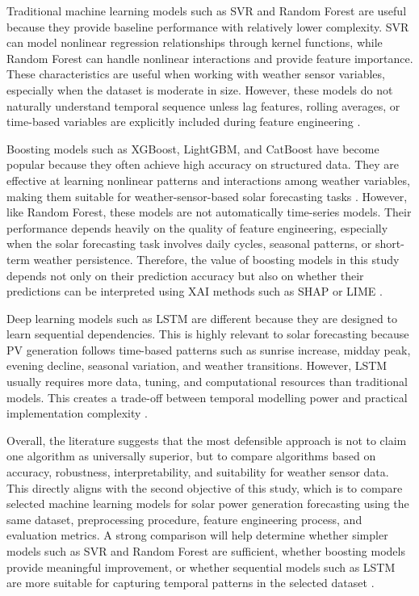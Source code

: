 Traditional machine learning models such as SVR and Random Forest are useful because they provide baseline performance with relatively lower complexity. SVR can model nonlinear regression relationships through kernel functions, while Random Forest can handle nonlinear interactions and provide feature importance. These characteristics are useful when working with weather sensor variables, especially when the dataset is moderate in size. However, these models do not naturally understand temporal sequence unless lag features, rolling averages, or time-based variables are explicitly included during feature engineering \parencite{JnanaVarshitha2025, Alhassan2025, CarvalhoJunior2025}.

Boosting models such as XGBoost, LightGBM, and CatBoost have become popular because they often achieve high accuracy on structured data. They are effective at learning nonlinear patterns and interactions among weather variables, making them suitable for weather-sensor-based solar forecasting tasks \parencite{JnanaVarshitha2025, Bakht2025, Alhassan2025}. However, like Random Forest, these models are not automatically time-series models. Their performance depends heavily on the quality of feature engineering, especially when the solar forecasting task involves daily cycles, seasonal patterns, or short-term weather persistence. Therefore, the value of boosting models in this study depends not only on their prediction accuracy but also on whether their predictions can be interpreted using XAI methods such as SHAP or LIME \parencite{TsaiLo2025, Pongphaw2025, JnanaVarshitha2025}.

Deep learning models such as LSTM are different because they are designed to learn sequential dependencies. This is highly relevant to solar forecasting because PV generation follows time-based patterns such as sunrise increase, midday peak, evening decline, seasonal variation, and weather transitions. However, LSTM usually requires more data, tuning, and computational resources than traditional models. This creates a trade-off between temporal modelling power and practical implementation complexity \parencite{Eren2025, TsaiLo2025, Duvuru2026}.

Overall, the literature suggests that the most defensible approach is not to claim one algorithm as universally superior, but to compare algorithms based on accuracy, robustness, interpretability, and suitability for weather sensor data. This directly aligns with the second objective of this study, which is to compare selected machine learning models for solar power generation forecasting using the same dataset, preprocessing procedure, feature engineering process, and evaluation metrics. A strong comparison will help determine whether simpler models such as SVR and Random Forest are sufficient, whether boosting models provide meaningful improvement, or whether sequential models such as LSTM are more suitable for capturing temporal patterns in the selected dataset \parencite{ArellanosTafur2025, Bakht2025, JnanaVarshitha2025, Alhassan2025, Eren2025}.

